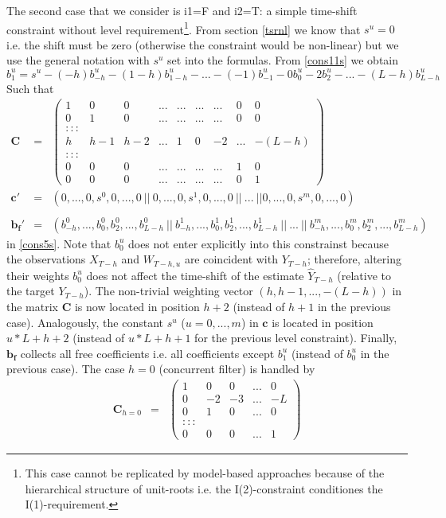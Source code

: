 \documentclass[11pt]{article}
\begin{document}
The second case that we consider is i1=F and i2=T: a simple time-shift constraint without level requirement\footnote{This case cannot be replicated by model-based approaches because of the hierarchical structure of unit-roots i.e. the I(2)-constraint conditiones the I(1)-requirement.}. From section \ref{tsrnl} we know that $s^u=0$ i.e. the shift must be zero (otherwise the constraint would be non-linear) but we use the general notation with $s^u$ set into the formulas. From \ref{cons11s} we obtain
\[
b_1^u=s^u-(-h)b_{-h}^u-(1-h)b_{1-h}^u-...-(-1)b_{-1}^u-0b_0^u-2b_2^u-...-(L-h)b_{L-h}^u
\]
Such that
\begin{eqnarray}\label{cons6s}
\mathbf{C}&=&\left(\begin{array}{ccccccccc}
1&0&0&...&...&...&...&0&0\\
0&1&0&...&...&...&...&0&0\\
:::\\
h&h-1&h-2&...&1&0&-2&...&-(L-h)\\
:::\\
0&0&0&...&...&...&...&1&0\\
0&0&0&...&...&...&...&0&1
\end{array}\right)\\
\mathbf{c}'&=&(0,...,0,s^0,0,...,0~||~0,...,0,s^1,0,...,0~||~...~||0,...,0,s^m,0,...,0)\nonumber\\
\nonumber\\
\mathbf{b_f}'&=&(b_{-h}^0,...,b_{0}^0,b_2^0,...,b_{L-h}^0~||~b_{-h}^1,...,b_{0}^1,b_2^1,...,b_{L-h}^1~||~...~||~b_{-h}^m,...,b_{0}^m,b_2^m,...,b_{L-h}^m)\nonumber
\end{eqnarray}
in \ref{cons5s}. Note that $b_0^u$ does not enter explicitly into this constrainst because the observations $X_{T-h}$ and $W_{T-h,u}$ are coincident with $Y_{T-h}$; therefore, altering their weights $b_0^u$ does not affect the time-shift of the estimate $\hat{Y}_{T-h}$ (relative to the target $Y_{T-h}$). The non-trivial weighting vector $(h,h-1,...,-(L-h))$ in the matrix $\mathbf{C}$ is now located in position $h+2$ (instead of $h+1$ in the previous case). Analogously, the constant $s^u$ ($u=0,...,m$) in $\mathbf{c}$ is located in position $u*L+h+2$ (instead of $u*L+h+1$ for the previous level constraint). Finally, $\mathbf{b_f}$ collects all free coefficients i.e. all coefficients except $b_1^u$ (instead of $b_0^u$ in the previous case). The case $h=0$ (concurrent filter) is handled by
\begin{eqnarray*}%
\mathbf{C}_{h=0}&=&\left(\begin{array}{ccccc}
1&0&0&...&0\\
0&-2&-3&...&-L\\
0&1&0&...&0\\
:::\\
0&0&0&...&1
\end{array}\right)\nonumber
\end{eqnarray*}
\end{document}
